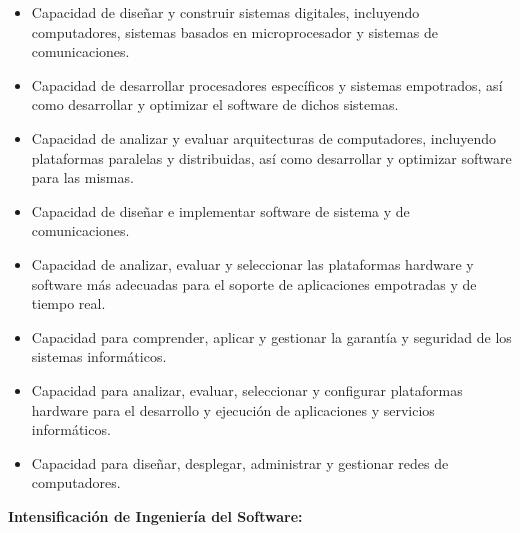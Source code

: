 \documentclass[a4paper]{article}
\newcommand\liststyleLviii{%
\renewcommand\labelitemi{{\textbullet}}
\renewcommand\labelitemii{{\textbullet}}
\renewcommand\labelitemiii{{\textbullet}}
\renewcommand\labelitemiv{{\textbullet}}
}
\begin{document}
\liststyleLviii
\begin{itemize}
\item Capacidad de dise\~nar y construir sistemas digitales, incluyendo computadores, sistemas basados en
microprocesador y sistemas de comunicaciones.
\item Capacidad de desarrollar procesadores espec\'ificos y sistemas empotrados, as\'i como desarrollar y optimizar el
software de dichos sistemas.
\item Capacidad de analizar y evaluar arquitecturas de computadores, incluyendo plataformas paralelas y distribuidas,
as\'i como desarrollar y optimizar software para las mismas.
\item Capacidad de dise\~nar e implementar software de sistema y de comunicaciones.
\item Capacidad de analizar, evaluar y seleccionar las plataformas hardware y software m\'as adecuadas para el soporte
de aplicaciones empotradas y de tiempo real.
\item Capacidad para comprender, aplicar y gestionar la garant\'ia y seguridad de los sistemas inform\'aticos.
\item Capacidad para analizar, evaluar, seleccionar y configurar plataformas hardware para el desarrollo y ejecuci\'on
de aplicaciones y servicios inform\'aticos.
\item Capacidad para dise\~nar, desplegar, administrar y gestionar redes de computadores.
\end{itemize}

\clearpage\pagestyle{plain}
\thispagestyle{FirstPage}
{\bfseries
Intensificaci\'on de Ingenier\'ia del Software:}
\end{document}
